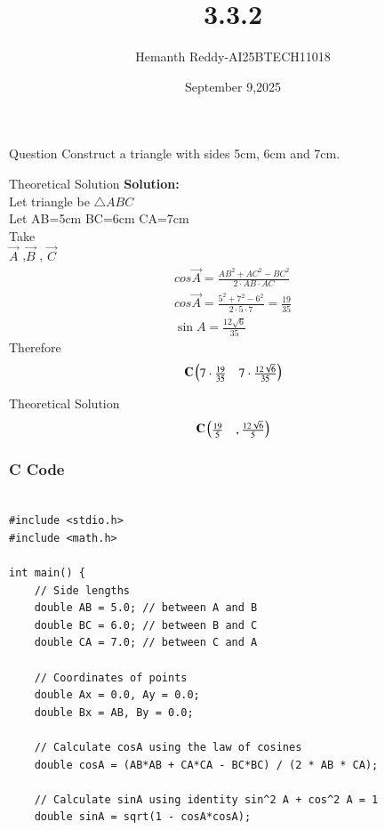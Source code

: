 \documentclass{beamer}
\title %
{3.3.2}
\date{September 9,2025}
\author %
{Hemanth Reddy-AI25BTECH11018}
\begin{document}
\frame{\titlepage}
\begin{frame}{Question}
Construct a triangle with sides 5cm, 6cm and 7cm. 
\end{frame}



\begin{frame}{Theoretical Solution}
\textbf{Solution:}\\
Let triangle be $\triangle ABC $ \\
Let AB=5cm BC=6cm CA=7cm \\Take\\

$\vec{A}$   ,$\vec{B}$  ,  $\vec{C}$
\begin{align}
    cos \vec{A} =\frac{AB^{2}+AC^{2}-BC^{2}}{2\cdot AB\cdot AC}\\
    cos \vec{A} =\frac{5^{2}+7^{2}-6^{2}}{ 2\cdot 5\cdot 7}=\frac{19}{35}\\
           \sin A = \frac{12\sqrt{6}}{35}     
\end{align}
 Therefore
\begin{align}
    \mathbf{C}\begin{pmatrix}7\cdot \frac{19}{35} & 7\cdot \frac{12\sqrt{6}}{35} \end{pmatrix}
    \end{align}


\end{frame}

\begin{frame}{Theoretical Solution}
\begin{align}
    \mathbf{C}\begin{pmatrix}\frac{19}{5} & ,\frac{12\sqrt{6}}{5} \end{pmatrix}
\end{align}


\end{frame}


\begin{frame}[fragile]
    \frametitle{C Code }
    \begin{lstlisting}

#include <stdio.h>
#include <math.h>

int main() {
    // Side lengths
    double AB = 5.0; // between A and B
    double BC = 6.0; // between B and C
    double CA = 7.0; // between C and A

    // Coordinates of points
    double Ax = 0.0, Ay = 0.0;
    double Bx = AB, By = 0.0;

    // Calculate cosA using the law of cosines
    double cosA = (AB*AB + CA*CA - BC*BC) / (2 * AB * CA);

    // Calculate sinA using identity sin^2 A + cos^2 A = 1
    double sinA = sqrt(1 - cosA*cosA);




    \end{lstlisting}
\end{frame}
\end{document}
